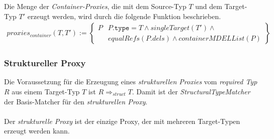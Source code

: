 \documentclass[a4paper,12pt]{article}
\begin{document}
Die Menge der \emph{Container-Proxies}, die mit dem Source-Typ $T$ und dem Target-Typ $T'$ erzeugt werden, wird durch die folgende Funktion beschrieben.
\begin{gather*}
\mathit{proxies_{container}(T,T')} := 
\left\{\begin{array}{l|l}
	P	& P\texttt{.type} = T \wedge  \mathit{singleTarget(T')} \wedge \mathit{ }\\
		& \mathit{equalRefs(P.dels)} \wedge \mathit{containerMDELList(P)} 
		 \end{array}
\right\}
\end{gather*}

\subsubsection{Struktureller Proxy}
Die Voraussetzung für die Erzeugung eines \emph{strukturellen Proxies} vom \emph{required Typ} $R$ aus einem Target-Typ $T$ ist $R \Rightarrow_{struct} T$. Damit ist der \emph{StructuralTypeMatcher} der Basis-Matcher für den \emph{strukturellen Proxy}.\\\\
Der \emph{strukturelle Proxy} ist der einzige Proxy, der mit mehreren Target-Typen erzeugt werden kann. 
\end{document}
